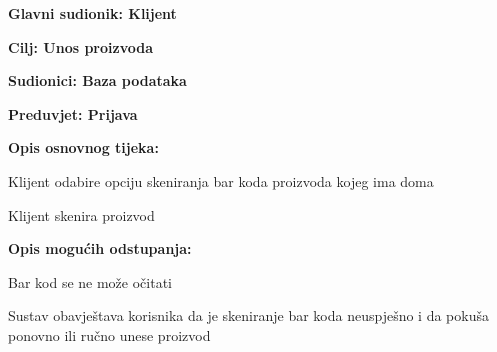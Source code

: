 					
					\noindent {}
					\begin{packed_item}
	
						\item \textbf{Glavni sudionik: Klijent}
						\item  \textbf{Cilj: Unos proizvoda }
						\item  \textbf{Sudionici: Baza podataka}
						\item  \textbf{Preduvjet: Prijava } 
						\item  \textbf{Opis osnovnog tijeka:}
						
						\item[] \begin{packed_enum}
	
							\item Klijent odabire opciju skeniranja bar koda proizvoda kojeg ima doma
							\item Klijent skenira proizvod
						\end{packed_enum}

					\item  \textbf{Opis mogućih odstupanja:}
						
						\item[] \begin{packed_item}
	
							\item[2.a] Bar kod se ne može očitati
							\item[] \begin{packed_enum}
								
								\item Sustav obavještava korisnika da je skeniranje bar koda neuspješno i da pokuša ponovno ili ručno unese proizvod	
							\end{packed_enum}
						\end{packed_item}
					\end{packed_item}
					
